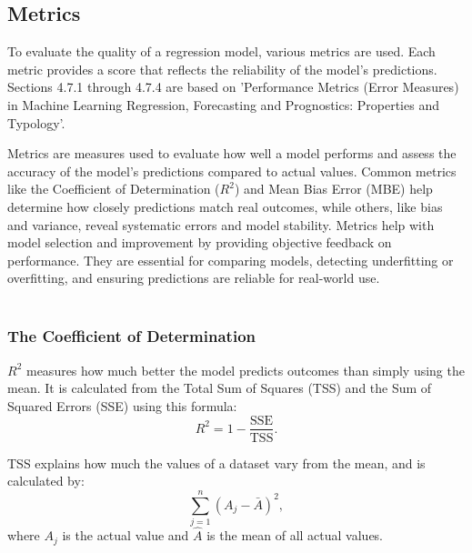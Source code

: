 \subsection{Metrics}
To evaluate the quality of a regression model, various metrics are used. Each metric provides a score that reflects the reliability of the model's predictions. Sections 4.7.1 through 4.7.4 are based on 'Performance Metrics (Error Measures) in Machine Learning Regression, Forecasting and Prognostics: Properties and Typology'\cite{metrics}. \newline

	\noindent Metrics are measures used to evaluate how well a model performs and assess the accuracy of the model’s predictions compared to actual values. Common metrics like the Coefficient of Determination ($R^{2}$) and Mean Bias Error (MBE) help determine how closely predictions match real outcomes, while others, like bias and variance, reveal systematic errors and model stability. Metrics help with model selection and improvement by providing objective feedback on performance. They are essential for comparing models, detecting underfitting or overfitting, and ensuring predictions are reliable for real-world use.
\\\\

\subsubsection{The Coefficient of Determination}
$R^2$ measures how much better the model predicts outcomes than simply using the mean. It is calculated from the Total Sum of Squares (TSS) and the Sum of Squared Errors (SSE) using this formula: 
\begin{equation}
R^2=1-\frac{\text{SSE}}{\text{TSS}}.
\end{equation}

\noindent TSS explains how much the values of a dataset vary from the mean, and is calculated by: 
\begin{equation}
\sum_{j=1}^{n}(A_j - \bar{A})^2,
\end{equation}
where $A_j$ is the actual value and $\hat{A}$ is the mean of all actual values.
\\\\

